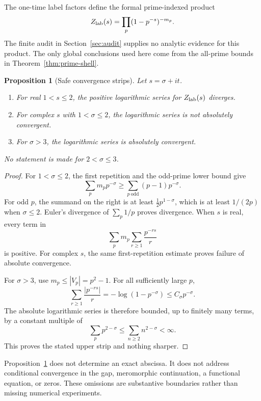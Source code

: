 \documentclass[11pt]{article}
\newtheorem{proposition}[theorem]{Proposition}
\theoremstyle{definition}
\theoremstyle{remark}
\begin{document}
The one-time label factors define the formal prime-indexed product
\begin{equation}
  Z_{\mathrm{lab}}(s)=\prod_p(1-p^{-s})^{-m_p}.
  \label{eq:global-label-product}
\end{equation}
The finite audit in Section~\ref{sec:audit} supplies no analytic evidence
for this product.  The only global conclusions used here come from the
all-prime bounds in Theorem~\ref{thm:prime-shell}.

\begin{proposition}[Safe convergence strips]
\label{prop:convergence}
Let \(s=\sigma+it\).
\begin{enumerate}
  \item For real \(1<s\le2\), the positive logarithmic series for
        \(Z_{\mathrm{lab}}(s)\) diverges.
  \item For complex \(s\) with \(1<\sigma\le2\), the logarithmic series is
        not absolutely convergent.
  \item For \(\sigma>3\), the logarithmic series is absolutely convergent.
\end{enumerate}
No statement is made for \(2<\sigma\le3\).
\end{proposition}

\begin{proof}
For \(1<\sigma\le2\), the first repetition and the odd-prime lower bound
give
\begin{equation}
  \sum_p m_pp^{-\sigma}
  \ge \sum_{p\ \mathrm{odd}}(p-1)p^{-\sigma}.
  \label{eq:convergence-lower}
\end{equation}
For odd \(p\), the summand on the right is at least
\(\tfrac12p^{1-\sigma}\), which is at least \(1/(2p)\) when
\(\sigma\le2\).  Euler's divergence of \(\sum_p1/p\) proves divergence.
When \(s\) is real, every term in
\[
  \sum_p m_p\sum_{r\ge1}\frac{p^{-rs}}r
\]
is positive.  For complex \(s\), the same first-repetition estimate proves
failure of absolute convergence.

For \(\sigma>3\), use \(m_p\le|V_p|=p^2-1\).  For all sufficiently large
\(p\),
\[
  \sum_{r\ge1}\frac{|p^{-rs}|}{r}
  =-\log(1-p^{-\sigma})
  \le C_\sigma p^{-\sigma}.
\]
The absolute logarithmic series is therefore bounded, up to finitely many
terms, by a constant multiple of
\[
  \sum_p p^{2-\sigma}
  \le \sum_{n\ge2}n^{2-\sigma}<\infty.
\]
This proves the stated upper strip and nothing sharper.
\end{proof}

Proposition~\ref{prop:convergence} does not determine an exact abscissa.  It
does not address conditional convergence in the gap, meromorphic
continuation, a functional equation, or zeros.  These omissions are
substantive boundaries rather than missing numerical experiments.
\end{document}
